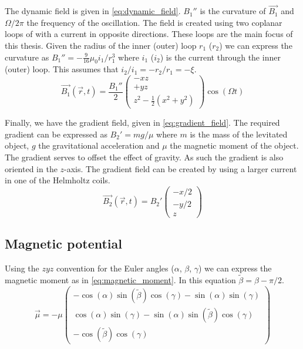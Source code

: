 The dynamic field is given in \autoref{eq:dynamic_field}. $B_1''$ is the curvature of $\vec{B_1}$ and $\Omega / 2\pi$ the frequency of the oscillation. The field is created using two coplanar loops of with a current in opposite directions. These loops are the main focus of this thesis. Given the radius of the inner (outer) loop $r_1$ ($r_2$) we can express the curvature as $B_1'' = -\frac{9}{16}\mu_0i_1/r_1^3$ where $i_1$ ($i_2$) is the current through the inner (outer) loop\cite{perdriat}. This assumes that $i_2/i_1 = -r_2/r_1 = -\xi$.
\begin{equation}
    \vec{B_1}(\vec{r}, t) = \frac{B_1''}{2} \begin{pmatrix}
        -xz \\
        +yz \\
        z^2 - \frac{1}{2}\left(x^2 + y^2\right)
    \end{pmatrix} \cos(\Omega t)
    \label{eq:dynamic_field}
\end{equation}

Finally, we have the gradient field, given in \autoref{eq:gradient_field}. The required gradient can be expressed as $B_2' = mg/\mu$ where $m$ is the mass of the levitated object, $g$ the gravitational acceleration and $\mu$ the magnetic moment of the object. The gradient serves to offset the effect of gravity. As such the gradient is also oriented in the $z$-axis. The gradient field can be created by using a larger current in one of the Helmholtz coils.
\begin{equation}
    \vec{B_2}(\vec{r}, t) = B_2' \begin{pmatrix}
        -x / 2 \\
        -y / 2 \\
        z
    \end{pmatrix}
    \label{eq:gradient_field}
\end{equation}

\subsection{Magnetic potential}
\label{subsec:magnetic_moment}
Using the $zyz$ convention for the Euler angles ($\alpha$, $\beta$, $\gamma$) we can express the magnetic moment as in \autoref{eq:magnetic_moment}\cite{perdriat}. In this equation $\tilde\beta = \beta - \pi/2$.
\begin{equation}
    \vec{\mu} = -\mu \begin{pmatrix}
        -\cos(\alpha)\sin(\tilde\beta)\cos(\gamma) - \sin(\alpha)\sin(\gamma) \\
        \cos(\alpha)\sin(\gamma) - \sin(\alpha)\sin(\tilde\beta)\cos(\gamma) \\
        -\cos(\tilde\beta)\cos(\gamma)
    \end{pmatrix}
    \label{eq:magnetic_moment}
\end{equation}

